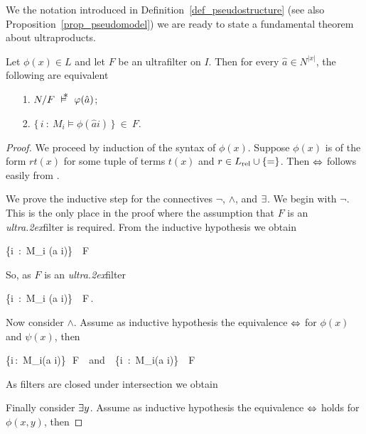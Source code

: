 \documentclass[creche.tex]{subfiles}
\begin{document}
We the notation introduced in Definition~\ref{def_pseudostructure} (see also Proposition~\ref{prop_pseudomodel}) we are ready to state a fundamental theorem about ultraproducts.

\begin{void_thm}[\L o\'{s} Theorem]
Let $\phi(x)\in L$ and let $F$ be an ultrafilter on $I$. Then for every $\hat a\in N^{|x|}$, the following are equivalent
\begin{itemize}
\item[1.] $N/F\ \pmodels\ \phi(\hat a)$;
\item[2.] $\big\{\,i\ :\ M_i\models \phi(\hat a i)\,\big\}\ \in\ F$.
\end{itemize}
\end{void_thm}

\begin{proof}
We proceed by induction of the syntax of $\phi(x)$. Suppose $\phi(x)$ is of the form $rt(x)$ for some tuple of terms $t(x)$ and $r\in L_{\rm rel}\cup\{=\}$. Then $\Leftrightarrow$ follows easily from .

We prove the inductive step for the connectives $\neg$, $\wedge$, and $\exists$. We begin with $\neg$. This is the only place in the proof where the assumption that $F$ is an \textit{ultra\kern.2ex}filter is required. From the inductive hypothesis we obtain

%
{\IFF}%
{\big\{i\ :\ M_i\; \models\; \phi(\hat a i)\;\big\}\ \notin\ F}

So, as $F$ is an \textit{ultra\kern.2ex}filter

\ceq{}{\IFF}%
{\big\{i\ :\ M_i\; \models\; \neg\phi(\hat a i)\;\big\}\ \in\ F\,.}

Now consider $\wedge$. Assume as inductive hypothesis the equivalence $\Leftrightarrow$ for $\phi(x)$ and $\psi(x)$, then

%
{\IFF}%
{\big\{i\,:\, M_i\models\phi(\hat a i)\big\}\,\in\, F\ \ {\rm and}\ \ \big\{i\, :\, M_i\models\psi(\hat a i)\big\}\, \in\, F}

As filters are closed under intersection we obtain


Finally consider $\exists y$.  Assume as inductive hypothesis the equivalence $\Leftrightarrow$ holds for $\phi(x,y)$, then


\end{proof}
\end{document}
